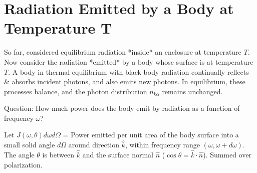 \documentclass[11pt]{article}
\newcommand{\nbar}{\overline{n}} %
\begin{document}
\section*{Radiation Emitted by a Body at Temperature T}

So far, considered equilibrium radiation *inside* an enclosure at temperature $T$. Now consider the radiation *emitted* by a body whose surface is at temperature $T$.
A body in thermal equilibrium with black-body radiation continually reflects \& absorbs incident photons, and also emits new photons. In equilibrium, these processes balance, and the photon distribution $\nbar_{k\alpha}$ remains unchanged.

\begin{center}
\end{center}
Question: How much power does the body emit by radiation as a function of frequency $\omega$?

Let $J(\omega, \theta) d\omega d\Omega$ = Power emitted per unit area of the body surface into a small solid angle $d\Omega$ around direction $\hat{k}$, within frequency range $(\omega, \omega+d\omega)$. The angle $\theta$ is between $\hat{k}$ and the surface normal $\hat{n}$ ($\cos\theta = \hat{k}\cdot\hat{n}$). Summed over polarization.

\begin{center}
\end{center}
\end{document}
